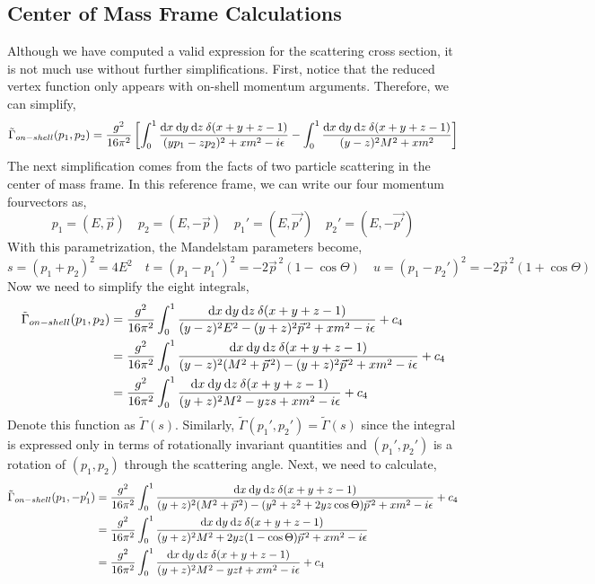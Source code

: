 \documentclass[12pt]{extarticle}
\begin{document}
\subsection{Center of Mass Frame Calculations}

Although we have computed a valid expression for the scattering cross section, it is not much use without further simplifications. First, notice that the reduced vertex function only appears with on-shell momentum arguments. Therefore, we can simplify,
\[\tilde{\Gamma}_{on-shell}(p_1, p_2) = \frac{ g^2}{16 \pi^2} \left[ \int_0^1 \frac{\mathrm{d}x \: \mathrm{d}y \: \mathrm{d}z \: \delta(x + y + z - 1)}{(y p_1 - z p_2)^2 + x m^2 - i \epsilon} - \int_0^1 \frac{\mathrm{d}x \: \mathrm{d}y \: \mathrm{d}z \: \delta(x + y + z - 1)}{(y - z)^2 M^2 + x m^2} \right]\]
The next simplification comes from the facts of two particle scattering in the center of mass frame. In this reference frame, we can write our four momentum fourvectors as,
\[ p_1 = (E, \vec{p}) \quad p_2 = (E, -\vec{p}) \quad p_1' = (E, \vec{p'}) \quad p_2' = (E, -\vec{p'}) \]
With this parametrization, the Mandelstam parameters become,
\[ s = (p_1 + p_2)^2 = 4 E^2 \quad t = (p_1 - p_1')^2 = -2 \vec{p}^{\, 2} (1 - \cos{\Theta}) \quad u = (p_1 - p_2')^2 = -2 \vec{p}^{\, 2} (1 + \cos{\Theta}) \]
Now we need to simplify the eight integrals,
\begin{align*} 
\tilde{\Gamma}_{on-shell}(p_1, p_2) &= \frac{g^2}{16 \pi^2} \int_0^1 \frac{\mathrm{d}x \: \mathrm{d}y \: \mathrm{d}z \: \delta(x + y + z - 1)}{(y - z)^2 E^2 - (y + z)^2 \vec{p}^{\, 2} + x m^2 - i \epsilon} + c_4
\\
& = \frac{g^2}{16 \pi^2} \int_0^1 \frac{\mathrm{d}x \: \mathrm{d}y \: \mathrm{d}z \: \delta(x + y + z - 1) }{(y - z)^2 (M^2 + \vec{p}^{\, 2}) - (y + z)^2 \vec{p}^{\, 2} + x m^2 - i \epsilon} + c_4
\\
& = \frac{g^2}{16 \pi^2} \int_0^1 \frac{ \mathrm{d}x \: \mathrm{d}y \: \mathrm{d}z \: \delta(x + y + z - 1) }{(y + z)^2 M^2 - yz s + x m^2 - i \epsilon} + c_4
\end{align*}
Denote this function as $\tilde{\Gamma}(s)$.
Similarly, $\tilde{\Gamma}(p_1', p_2') = \tilde{\Gamma}(s)$ since the integral is expressed only in terms of rotationally invariant quantities and $(p_1', p_2')$ is a rotation of $(p_1, p_2)$ through the scattering angle.
Next, we need to calculate, 
\begin{align*} 
\tilde{\Gamma}_{on-shell}(p_1, -p_1') &= \frac{g^2}{16 \pi^2} \int_0^1 \frac{\mathrm{d}x \: \mathrm{d}y \: \mathrm{d}z \: \delta(x + y + z - 1)}{(y + z)^2 (M^2 + \vec{p}^{\, 2}) - (y^2 + z^2 + 2 yz \cos{\Theta}) \vec{p}^{\, 2}+ x m^2 - i \epsilon} + c_4 
\\
& = \frac{g^2}{16 \pi^2} \int_0^1 \frac{\mathrm{d}x \: \mathrm{d}y \: \mathrm{d}z \: \delta(x + y + z - 1)}{(y + z)^2 M^2 + 2yz(1 - \cos{\Theta})\vec{p}^{\, 2} + x m^2 - i \epsilon}
\\
& = \frac{g^2}{16 \pi^2} \int_0^1 \frac{\mathrm{d}x \: \mathrm{d}y \: \mathrm{d}z \: \delta(x + y + z - 1) }{(y + z)^2M^2 - yz t + x m^2 - i \epsilon} + c_4
\end{align*}
\end{document}
